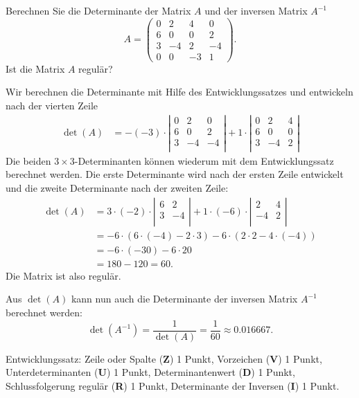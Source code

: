 Berechnen Sie die Determinante der Matrix $A$ und der inversen Matrix $A^{-1}$
\[
A=
\begin{pmatrix}
 0 & 2 & 4 & 0\\
 6 & 0 & 0 & 2\\
 3 & -4 & 2 & -4\\
 0 & 0 & -3 & 1
\end{pmatrix}.
\]
Ist die Matrix $A$ regulär?


\begin{loesung}
Wir berechnen die Determinante mit Hilfe des Entwicklungssatzes 
und entwickeln nach der vierten Zeile
\begin{align*}
\det(A)
&=
-
(-3)\cdot\left|
\begin{matrix}
 0 & 2 & 0\\
 6 & 0 & 2\\
 3 & -4 & -4\\
\end{matrix}
\right|
+
1\cdot\left|
\begin{matrix}
 0 & 2 & 4\\
 6 & 0 & 0 \\
 3 & -4 & 2\\
\end{matrix}
\right|
\end{align*}
Die beiden $3\times 3$-Determinanten können wiederum mit dem Entwicklungssatz
berechnet werden. Die erste Determinante wird nach der ersten Zeile entwickelt 
und die zweite Determinante nach der zweiten Zeile:
\begin{align*}
\det(A)
&=
3\cdot (-2)\cdot \left|
\begin{matrix}
 6 & 2\\
 3 & -4\\
\end{matrix}
\right|
+
1\cdot (-6)\cdot\left|
\begin{matrix}
2 & 4\\
-4 & 2\\
\end{matrix}
\right|\\
&= -6\cdot (6\cdot (-4) - 2 \cdot 3) - 6 \cdot (2\cdot 2 - 4 \cdot (-4))\\
&= -6\cdot (-30) - 6 \cdot 20\\
&= 180 - 120 = 60.
\end{align*}
Die Matrix ist also regulär.

Aus $\det(A)$ kann nun auch die Determinante der inversen Matrix $A^{-1}$ berechnet werden:
\[
  \det(A^{-1}) = \dfrac{1}{\det(A)} = \dfrac{1}{60}\approx 0.016667.
\]
\end{loesung}

\begin{bewertung}
Entwicklungssatz: Zeile oder Spalte ({\bf Z}) 1 Punkt,
Vorzeichen ({\bf V}) 1 Punkt,
Unterdeterminanten ({\bf U}) 1 Punkt,
Determinantenwert ({\bf D}) 1 Punkt,
Schlussfolgerung regulär ({\bf R}) 1 Punkt,
Determinante der Inversen ({\bf I}) 1 Punkt.
\end{bewertung}

